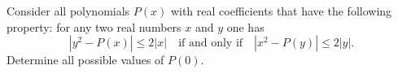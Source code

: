 Consider all polynomials 
$P(x)$
 with real coefficients that have the following property: for any two real numbers 
$x$
 and 
$y$
 one has 
\[|y^2-P(x)|\le 2|x|\quad\text{if and only if}\quad |x^2-P(y)|\le 2|y|.\]
 Determine all possible values of 
$P(0)$.


